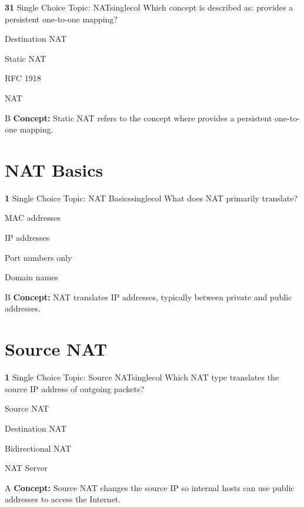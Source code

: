 \documentclass[10pt,a4paper]{article}
\begin{document}
\begin{qcard}{\color{white}\textbf{31} \hfill \small Single Choice \textbar{} Topic: NAT}{singlecol}
Which concept is described as: provides a persistent one-to-one mapping?

\begin{qoptions}
\item Destination NAT
\item Static NAT
\item RFC 1918
\item NAT
\end{qoptions}
\begin{explainbox}{B}
\textbf{Concept:} Static NAT refers to the concept where provides a persistent one-to-one mapping.
\end{explainbox}
\end{qcard}

\section{NAT Basics}
\begin{qcard}{\color{white}\textbf{1} \hfill \small Single Choice \textbar{} Topic: NAT Basics}{singlecol}
What does NAT primarily translate?

\begin{qoptions}
\item MAC addresses
\item IP addresses
\item Port numbers only
\item Domain names
\end{qoptions}
\begin{explainbox}{B}
\textbf{Concept:} NAT translates IP addresses, typically between private and public addresses.
\end{explainbox}
\end{qcard}

\section{Source NAT}
\begin{qcard}{\color{white}\textbf{1} \hfill \small Single Choice \textbar{} Topic: Source NAT}{singlecol}
Which NAT type translates the source IP address of outgoing packets?

\begin{qoptions}
\item Source NAT
\item Destination NAT
\item Bidirectional NAT
\item NAT Server
\end{qoptions}
\begin{explainbox}{A}
\textbf{Concept:} Source NAT changes the source IP so internal hosts can use public addresses to access the Internet.
\end{explainbox}
\end{qcard}
\end{document}
